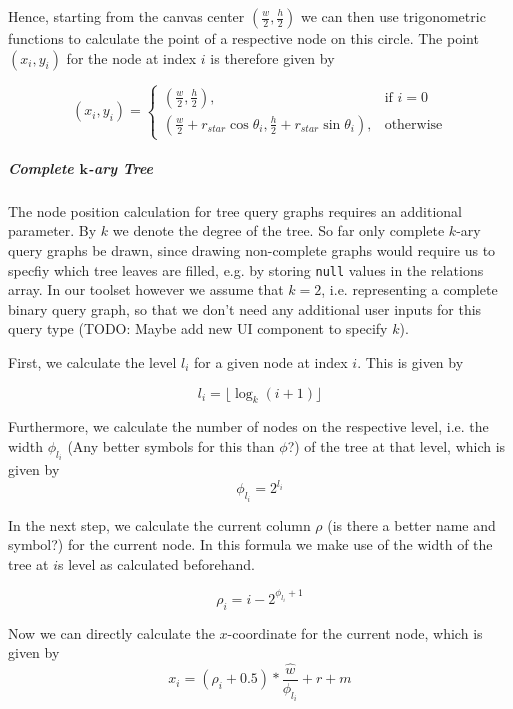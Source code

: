 Hence, starting from the canvas center $(\frac{w}{2}, \frac{h}{2})$ we can then use trigonometric functions to calculate the point of a respective node on this circle.
The point $(x_i, y_i)$ for the node at index $i$ is therefore given by

\begin{equation}
    (x_i, y_i) = 
    \begin{cases}
        (\frac{w}{2}, \frac{h}{2}),& \text{if } i = 0\\
        (\frac{w}{2} + r_{star}\cos{\theta_i}, \frac{h}{2} + r_{star}\sin{\theta_i}), & \text{otherwise}
    \end{cases}
\end{equation}

\subparagraph{Complete $\mathbf{k}$-ary Tree}

The node position calculation for tree query graphs requires an additional parameter. 
By $k$ we denote the degree of the tree. So far only complete $k$-ary query graphs be drawn, since drawing non-complete graphs would require us to specfiy which tree leaves are filled, e.g. by storing \texttt{null} values in the relations array. In our toolset however we assume that $k = 2$, i.e. representing a complete binary query graph, so that we don't need any additional user inputs for this query type (TODO: Maybe add new UI component to specify $k$).

First, we calculate the level $l_i$ for a given node at index $i$. This is given by

\begin{equation}
    l_i = \lfloor \log_{k}(i+1)\rfloor
\end{equation}

Furthermore, we calculate the number of nodes on the respective level, i.e. the width $\phi_{l_i}$ (Any better symbols for this than $\phi$?) of the tree at that level, which is given by
\begin{equation}
    \phi_{l_i} = 2^{l_i}
\end{equation}

In the next step, we calculate the current column $\rho$ (is there a better name and symbol?) for the current node. In this formula we make use of the width of the tree at $i$s level as calculated beforehand.

\begin{equation}
    \rho_{i} = i - 2^{\phi_{l_i} + 1}
\end{equation}

Now we can directly calculate the $x$-coordinate for the current node, which is given by
\begin{equation}
    x_i = (\rho_{i} + 0.5) * \frac{\hat{w}}{\phi_{l_i}} + r + m
\end{equation}

